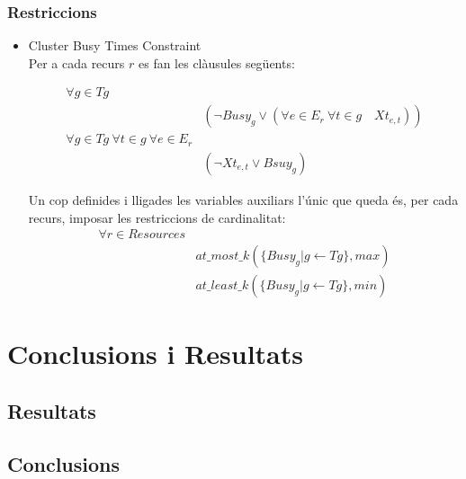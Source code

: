 \documentclass[8pt]{beamer}
\begin{document}
  \begin{frame}
    \frametitle{Restriccions}

    \begin{itemize}
    
      \item Cluster Busy Times Constraint \\
      Per a cada recurs $r$ es fan les clàusules següents:
      
      \begin{align*}
        \forall g \in Tg & \\
        &(\neg Busy_g \lor (\forall e \in E_r \ \forall t \in g \quad Xt_{e,t}))\\
        \forall g \in Tg \ \forall t \in g \ \forall e \in E_r &\\
        & (\neg Xt_{e,t} \lor Bsuy_g)
      \end{align*}
    
      Un cop definides i lligades les variables auxiliars l'únic que queda és, per cada recurs, imposar les restriccions de cardinalitat:
      \begin{align*}
        \forall r \in Resources &\\
        & at\_most\_k(\{ Busy_g | g \leftarrow Tg\}, max) \\
        & at\_least\_k(\{ Busy_g | g \leftarrow Tg\}, min)
       \end{align*}
          
    \end{itemize}
  
  \end{frame}


  \section{Conclusions i Resultats}
  \subsection{Resultats}
  
  \begin{frame}
  \end{frame}

  \subsection{Conclusions}





  
\end{document}
